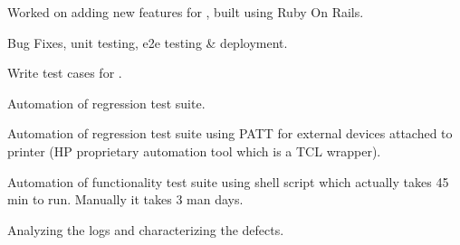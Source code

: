 \documentclass[]{my-resume-openfont}
\begin{document}
\begin{minipage}[t]{0.66\textwidth}
\begin{tightemize}
\item Worked on adding new features for , built using Ruby On Rails.
\item Bug Fixes, unit testing, e2e testing \& deployment.
\end{tightemize}
\sectionsep

\begin{tightemize}
\item Write test cases for .
\item Automation of regression test suite.
\end{tightemize}
\sectionsep

\begin{tightemize}
\item Automation of regression test suite using PATT for external devices attached to printer (HP proprietary automation tool which is a TCL wrapper).
\item Automation of functionality test suite using shell script which actually takes 45 min to run. Manually it takes 3 man days.
\item Analyzing the logs and characterizing the defects.
\end{tightemize}
\sectionsep

\end{minipage} 
\end{document}
